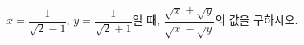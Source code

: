 $x=\dfrac{1}{\sqrt{2}-1}$, $y=\dfrac{1}{\sqrt{2}+1}$일 때, $\dfrac{\sqrt{x}+\sqrt{y}}{\sqrt{x}-\sqrt{y}}$의 값을 구하시오.

